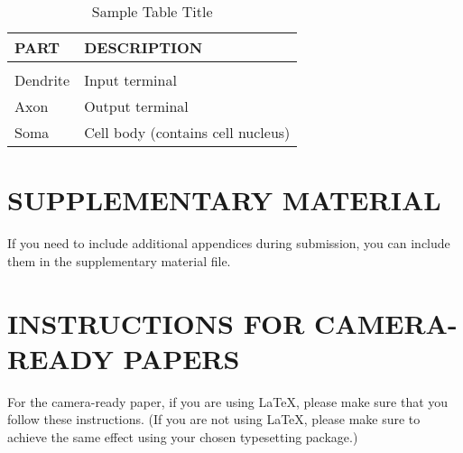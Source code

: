 \documentclass[twoside]{article}
\begin{document}
\begin{table}[h]
\caption{Sample Table Title} \label{sample-table}
\begin{center}
\begin{tabular}{ll}
{\bf PART}  &{\bf DESCRIPTION} \\
\hline \\
Dendrite         &Input terminal \\
Axon             &Output terminal \\
Soma             &Cell body (contains cell nucleus) \\
\end{tabular}
\end{center}
\end{table}

\section{SUPPLEMENTARY MATERIAL}

If you need to include additional appendices during submission, you
can include them in the supplementary material file.


\newpage

\section{INSTRUCTIONS FOR CAMERA-READY PAPERS}

For the camera-ready paper, if you are using \LaTeX, please make sure
that you follow these instructions.  (If you are not using \LaTeX,
please make sure to achieve the same effect using your chosen
typesetting package.)
\end{document}
